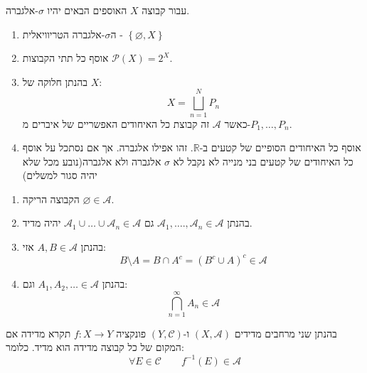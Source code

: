 \documentclass{tstextbook}
\begin{document}
\begin{example}
עבור קבוצה \(X\) האוספים הבאים יהיו \(\sigma\)-אלגברה.

  \begin{enumerate}
    \item ה\(\sigma\)-אלגברה הטריוויאלית - \(\left\{  \varnothing, X  \right\}\)


    \item אוסף כל תתי הקבוצות \(\mathcal{P}(X)=2^{X}\). 


    \item בהנתן חלוקה של \(X\): 
$$X= \bigsqcup_{n=1}^{N}P_{n}$$
כאשר \(\mathcal{A}\) זה קבוצת כל האיחודים האפשריים של איברים מ-\(P_{1},\dots,P_{n}\).


    \item אוסף כל האיחודים הסופיים של קטעים ב-\(\mathbb{R}\). זהו אפילו אלגברה. אך אם נסתכל על אוסף כל האיחודים של קטעים בני מנייה לא נקבל לא \(\sigma\) אלגברה ולא אלגברה(נובע מכל שלא יהיה סגור למשלים) 


  \end{enumerate}
\end{example}
\begin{proposition}
  \begin{enumerate}
    \item הקבוצה הריקה \(\varnothing \in \mathcal{A}\). 


    \item בהנתן \(\mathcal{A}_{1},\dots.,\mathcal{A}_{n} \in \mathcal{A}\) גם \(\mathcal{A}_{1}\cup\dots \cup \mathcal{A}_{n}\in \mathcal{A}\) יהיה מדיד. 


    \item בהנתן \(A,B \in \mathcal{A}\) אזי: 
$$B\setminus A = B \cap A^{c}=\left( B^{c}\cup A\right)^{c}\in \mathcal{A}$$


    \item בהנתן \({A}_{1},{A}_{2},\dots \in \mathcal{A}\) וגם: 
$$\bigcap_{n=1}^{\infty} {A}_{n}\in \mathcal{A}$$


  \end{enumerate}
\end{proposition}
\begin{definition}
בהנתן שני מרחבים מדידים \((X,\mathcal{A})\) ו-\(\left( Y,\mathcal{C} \right)\) פונקציה \(f:X\to Y\) תקרא מדידה אם המקום של כל קבוצה מדידה הוא מדיד. כלומר:
$$\forall E \in \mathcal{C} \qquad f^{-1}(E)\in \mathcal{A}$$

\end{definition}
\end{document}
